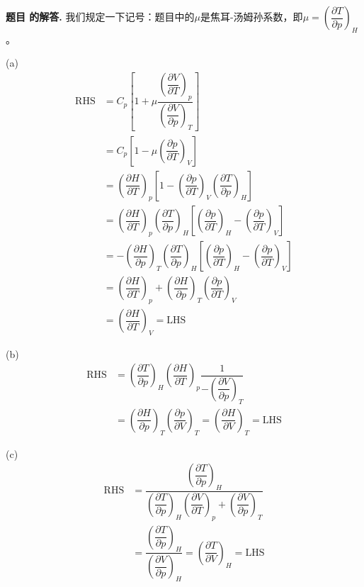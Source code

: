 \documentclass[12pt, a4paper, oneside]{ctexart}
\newcounter{problemname}
\newenvironment{solution}
  {\par\noindent\textbf{题目 \theproblemname 的解答. }}
  {\par}
\begin{document}
\begin{solution}
    我们规定一下记号：题目中的$\mu$是焦耳-汤姆孙系数，即$\mu = \left(\dfrac{\partial T}{\partial p}\right)_H$。

    (a)
    \begin{align*}
        \mathrm{RHS} &= C_p\left[1+\mu \dfrac{\left(\dfrac{\partial V}{\partial T}\right)_p}{\left(\dfrac{\partial V}{\partial p}\right)_T} \right] \\
        &= C_p\left[1-\mu \left(\dfrac{\partial p}{\partial T}\right)_V \right] \\
        &= \left(\dfrac{\partial H}{\partial T}\right)_p \left[1-\left(\dfrac{\partial p}{\partial T}\right)_V \left(\dfrac{\partial T}{\partial p}\right)_H\right] \\
        &= \left(\dfrac{\partial H}{\partial T}\right)_p \left(\dfrac{\partial T}{\partial p}\right)_H \left[\left(\dfrac{\partial p}{\partial T}\right)_H - \left(\dfrac{\partial p}{\partial T}\right)_V\right] \\
        &= -\left( \dfrac{\partial H}{\partial p}\right)_T \left(\dfrac{\partial T}{\partial p}\right)_H \left[\left(\dfrac{\partial p}{\partial T}\right)_H - \left(\dfrac{\partial p}{\partial T}\right)_V\right]\\
        &= \left( \dfrac{\partial H}{\partial T}\right)_p + \left( \dfrac{\partial H}{\partial p}\right)_T \left(\dfrac{\partial p}{\partial T}\right)_V \\
        &= \left( \dfrac{\partial H}{\partial T}\right)_V = \mathrm{LHS}
    \end{align*}

    (b)
    \begin{align*}
        \mathrm{RHS} &= \left(\dfrac{\partial T}{\partial p}\right)_H \left(\dfrac{\partial H}{\partial T}\right)_p \dfrac{1}{- \left(\dfrac{\partial V}{\partial p}\right)_T}\\
        &= \left(\dfrac{\partial H}{\partial p}\right)_T \left(\dfrac{\partial p}{\partial V}\right)_T = \left(\dfrac{\partial H}{\partial V}\right)_T = \mathrm{LHS}
    \end{align*}

    (c)
    \begin{align*}
        \mathrm{RHS} &= \dfrac{\left(\dfrac{\partial T}{\partial p}\right)_H}{\left(\dfrac{\partial T}{\partial p}\right)_H \left(\dfrac{\partial V}{\partial T}\right)_p +\left(\dfrac{\partial V}{\partial p}\right)_T} \\
        &= \dfrac{\left(\dfrac{\partial T}{\partial p}\right)_H}{\left(\dfrac{\partial V}{\partial p}\right)_H} = \left(\dfrac{\partial T}{\partial V}\right)_H = \mathrm{LHS}
    \end{align*}


\end{solution}
\end{document}

